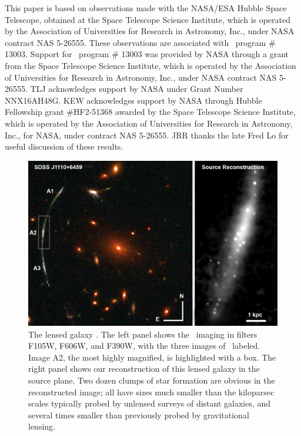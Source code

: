 This paper is based on observations made with the 
NASA/ESA Hubble Space Telescope, obtained at the Space Telescope Science Institute, 
which is operated by the Association of Universities for Research in Astronomy, Inc., 
under NASA contract NAS 5-26555. 
These observations are associated with \hst\ program \# 13003.
Support for \hst\  program \# 13003 was provided by NASA through a grant from
the Space Telescope Science Institute, which is operated by the
Association of Universities for Research in Astronomy, Inc., under
NASA contract NAS 5-26555. 
TLJ acknowledges support by NASA under Grant Number NNX16AH48G.
KEW acknowledges support by NASA through Hubble Fellowship grant
\#HF2-51368 awarded by the Space Telescope Science Institute, which is
operated by the Association of Universities for Research in Astronomy,
Inc., for NASA, under contract NAS 5-26555.
JRR thanks the late Fred Lo for useful discussion of these results.

\begin{figure}
\includegraphics[width=\textwidth,angle=0]{Chap5/f1.pdf} %
\caption[The lensed galaxy \giantarc\ and its source reconstruction]{The lensed galaxy \giantarc . The left panel shows
the \hst\ imaging in filters F105W, F606W, and F390W, with the three images
of \arcname\ labeled.  Image A2, the most highly magnified, is highlighted
with a box. The right panel shows our reconstruction of this lensed
galaxy in the source plane.   Two dozen clumps of star formation 
are obvious in the reconstructed image; all have sizes much smaller
than the kiloparsec scales typically probed by unlensed surveys of distant galaxies, 
and several times smaller than previously probed by gravitational lensing.
}
\label{chap5:fig:HSTimage}
\end{figure}

